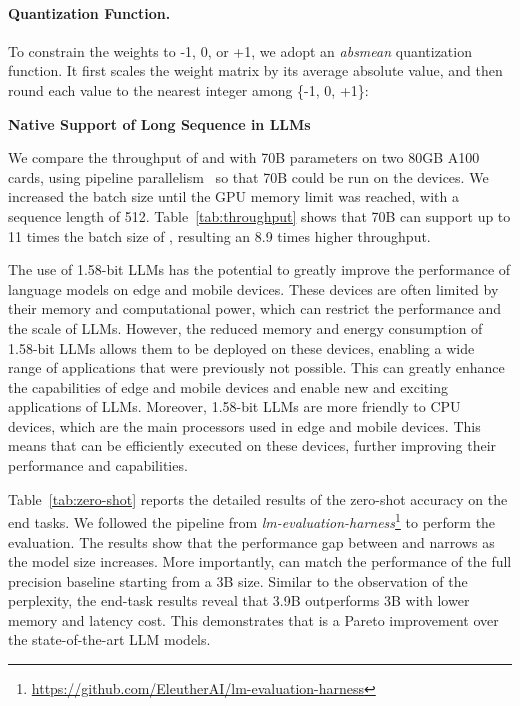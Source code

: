 \paragraph{Quantization Function.} To constrain the weights to -1, 0, or +1, we adopt an \emph{absmean} quantization function. It first scales the weight matrix by its average absolute value, and then round each value to the nearest integer among \{-1, 0, +1\}:

\textbf{Native Support of Long Sequence in LLMs}

We compare the throughput of  and  with 70B parameters on two 80GB A100 cards, using pipeline parallelism~\cite{gpipe} so that  70B could be run on the devices. We increased the batch size until the GPU memory limit was reached, with a sequence length of 512. Table~\ref{tab:throughput} shows that  70B can support up to 11 times the batch size of , resulting an 8.9 times higher throughput.

The use of 1.58-bit LLMs has the potential to greatly improve the performance of language models on edge and mobile devices. These devices are often limited by their memory and computational power, which can restrict the performance and the scale of LLMs. However, the reduced memory and energy consumption of 1.58-bit LLMs allows them to be deployed on these devices, enabling a wide range of applications that were previously not possible. This can greatly enhance the capabilities of edge and mobile devices and enable new and exciting applications of LLMs. Moreover, 1.58-bit LLMs are more friendly to CPU devices, which are the main processors used in edge and mobile devices. This means that  can be efficiently executed on these devices, further improving their performance and capabilities.

Table~\ref{tab:zero-shot} reports the detailed results of the zero-shot accuracy on the end tasks. We followed the pipeline from \emph{lm-evaluation-harness}\footnote{\url{https://github.com/EleutherAI/lm-evaluation-harness}} to perform the evaluation. The results show that the performance gap between  and  narrows as the model size increases. More importantly,  can match the performance of the full precision baseline starting from a 3B size. Similar to the observation of the perplexity, the end-task results reveal that  3.9B outperforms  3B with lower memory and latency cost. This demonstrates that  is a Pareto improvement over the state-of-the-art LLM models.

